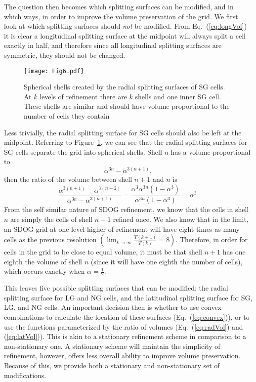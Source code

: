 The question then becomes which splitting surfaces can be modified, and in which ways, in order to improve the volume preservation of the grid.
We first look at which splitting surfaces should \textit{not} be modified.
From Eq.~(\ref{eq:longVol}) it is clear a longitudinal splitting surface at the midpoint will always split a cell exactly in half, and therefore since all longitudinal splitting surfaces are symmetric, they should not be changed.


\begin{figure}[tb]
	\texttt{[image: Fig6.pdf]}
	\caption[Title]{
		Spherical shells created by the radial splitting surfaces of SG cells.
		At $k$ levels of refinement there are $k$ shells and one inner SG cell.
		These shells are similar and should have volume proportional to the number of cells they contain
	}
	\label{fig:sg-rad-splits}
\end{figure}


Less trivially, the radial splitting surface for SG cells should also be left at the midpoint.
Referring to Figure~\ref{fig:sg-rad-splits}, we can see that the radial splitting surfaces for SG cells separate the grid into spherical shells.
Shell $n$ has a volume proportional to
%
\begin{equation}
\alpha^{3n} - \alpha^{3 \left( n + 1 \right)},
\end{equation}
%
then the ratio of the volume between shell $n+1$ and $n$ is
%
\begin{equation}
\frac{ \alpha^{3 \left(n + 1 \right)} - \alpha^{3\left( n + 2 \right)} }{ \alpha^{3n} - \alpha^{3 \left( n + 1 \right)} } = \frac{ \alpha^{3} \alpha^{3n} \left( 1 - \alpha^{3} \right) }{ \alpha^{3n} \left( 1 - \alpha^{3} \right) } = \alpha^{3}.
\end{equation}
%
From the self similar nature of SDOG refinement, we know that the cells in shell $n$ are simply the cells of shell $n+1$ refined once.
We also know that in the limit, an SDOG grid at one level higher of refinement will have eight times as many cells as the previous resolution $\left( \lim_{k \to \infty} \frac{ T(k+1) }{ T(k) }  = 8 \right)$.
Therefore, in order for cells in the grid to be close to equal volume, it must be that shell $n+1$ has one eighth the volume of shell $n$ (since it will have one eighth the number of cells), which occurs exactly when $\alpha = \frac{1}{2}$.


This leaves five possible splitting surfaces that can be modified: the radial splitting surface for LG and NG cells, and the latitudinal splitting surface for SG, LG, and NG cells.
An important decision then is whether to use convex combinations to calculate the location of these surfaces (Eq.~(\ref{eq:convex})), or to use the functions parameterized by the ratio of volumes (Eq.~(\ref{eq:radVol}) and (\ref{eq:latVol})).
This is akin to a stationary refinement scheme in comparison to a non-stationary one.
A stationary scheme will maintain the simplicity of refinement, however, offers less overall ability to improve volume preservation.
Because of this, we provide both a stationary and non-stationary set of modifications.


